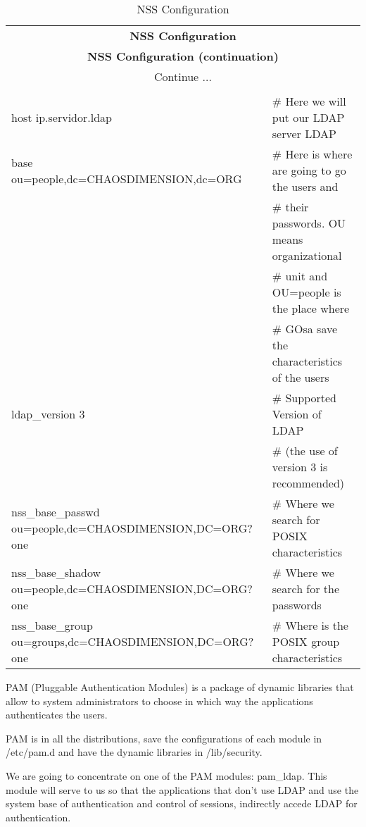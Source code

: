 \begin{center}
\begin{longtable}{|ll|}\hline
\caption{NSS Configuration}\\
\hline \hline
\multicolumn{2}{|c|}{\textbf{NSS Configuration}}\\
\hline \hline
\endfirsthead
\hline \hline
\multicolumn{2}{|c|}{\textbf{NSS Configuration (continuation)}}\\
\hline \hline
\endhead
\hline
\multicolumn{2}{|c|}{Continue $\ldots$}\\
\hline
\endfoot
\hline
\multicolumn{2}{|c|}{\textbf{End}}\\
\hline
\endlastfoot
host ip.servidor.ldap & \# Here we will put our LDAP server LDAP\\
base ou=people,dc=CHAOSDIMENSION,dc=ORG & \# Here is where are going to go the users and\\
 & \# their passwords. OU means organizational\\
 & \# unit and OU=people is the place where\\
 & \# GOsa save the characteristics of the users\\
ldap\_version 3 & \# Supported Version of LDAP \\
 & \# (the use of version 3 is recommended)\\
nss\_base\_passwd ou=people,dc=CHAOSDIMENSION,DC=ORG?one & \# Where we search for POSIX characteristics\\
nss\_base\_shadow ou=people,dc=CHAOSDIMENSION,DC=ORG?one & \# Where we search for the passwords\\
nss\_base\_group ou=groups,dc=CHAOSDIMENSION,DC=ORG?one & \# Where is the POSIX group characteristics\\
\end{longtable}
\end{center}

PAM (Pluggable Authentication Modules) is a package of dynamic libraries that allow to system administrators to choose in which way the applications authenticates the users. 

PAM is in all the distributions, save the configurations of each module in /etc/pam.d and have the dynamic libraries in /lib/security. 

We are going to concentrate on one of the PAM modules: pam\_ldap. This module will serve to us so that the applications that don't  use LDAP and use the system base of authentication and control of sessions, indirectly accede LDAP for authentication. 

